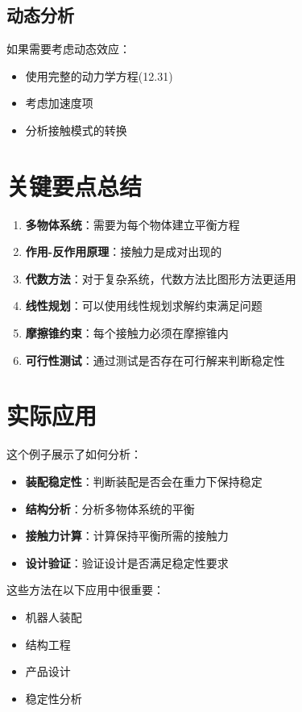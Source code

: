 \documentclass[12pt,a4paper]{article}
\begin{document}
\subsection{动态分析}

如果需要考虑动态效应：

\begin{itemize}
    \item 使用完整的动力学方程(12.31)
    \item 考虑加速度项
    \item 分析接触模式的转换
\end{itemize}

\section{关键要点总结}

\begin{enumerate}
    \item \textbf{多物体系统}：需要为每个物体建立平衡方程
    
    \item \textbf{作用-反作用原理}：接触力是成对出现的
    
    \item \textbf{代数方法}：对于复杂系统，代数方法比图形方法更适用
    
    \item \textbf{线性规划}：可以使用线性规划求解约束满足问题
    
    \item \textbf{摩擦锥约束}：每个接触力必须在摩擦锥内
    
    \item \textbf{可行性测试}：通过测试是否存在可行解来判断稳定性
\end{enumerate}

\section{实际应用}

这个例子展示了如何分析：

\begin{itemize}
    \item \textbf{装配稳定性}：判断装配是否会在重力下保持稳定
    \item \textbf{结构分析}：分析多物体系统的平衡
    \item \textbf{接触力计算}：计算保持平衡所需的接触力
    \item \textbf{设计验证}：验证设计是否满足稳定性要求
\end{itemize}

这些方法在以下应用中很重要：
\begin{itemize}
    \item 机器人装配
    \item 结构工程
    \item 产品设计
    \item 稳定性分析
\end{itemize}
\end{document}
